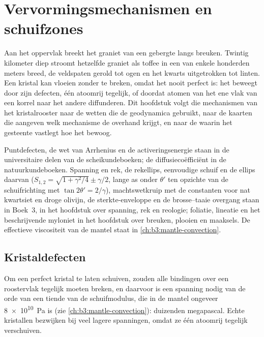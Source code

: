 \chapter{Vervormingsmechanismen en schuifzones}\label{ch:b3:deformation-mechanisms}

Aan het oppervlak breekt het graniet van een gebergte langs breuken. Twintig
kilometer diep stroomt hetzelfde graniet als toffee in een  van enkele
honderden meters breed, de veldspaten gerold tot ogen en het kwarts uitgetrokken
tot linten. Een kristal kan vloeien zonder te breken, omdat het nooit perfect is:
het beweegt door zijn defecten, één atoomrij tegelijk, of doordat atomen van
het ene vlak van een korrel naar het andere diffunderen. Dit hoofdstuk volgt die mechanismen van het
kristalrooster naar de wetten die de geodynamica gebruikt, naar de kaarten die aangeven welk
mechanisme de overhand krijgt, en naar de  waarin het gesteente vastlegt hoe het bewoog.

\begin{recall}
Puntdefecten, de wet van Arrhenius en de activeringsenergie staan in de
universitaire delen van de scheikundeboeken; de diffusiecoëfficiënt in de
natuurkundeboeken. Spanning en rek, de rekellips, eenvoudige schuif en de ellips daarvan
($S_{1,2} = \sqrt{1 + \gamma^2/4} \pm \gamma/2$, lange as onder $\theta'$ ten opzichte van de
schuifrichting met $\tan2\theta' = 2/\gamma$), machtswetkruip met de
constanten voor nat kwartsiet en droge olivijn, de sterkte-enveloppe en de
brosse--taaie overgang staan in Boek~3, in het hoofdstuk over
spanning, rek en reologie; foliatie, lineatie en het beschrijvende
myloniet in het hoofdstuk over breuken, plooien en maaksels. De effectieve viscositeit
van de mantel staat in \cref{ch:b3:mantle-convection}.
\end{recall}

\section{Kristaldefecten}

Om een perfect kristal te laten schuiven, zouden alle bindingen over een roostervlak tegelijk
moeten breken, en daarvoor is een spanning nodig van de orde van een tiende van de schuifmodulus,
die in de mantel ongeveer \qty{8e10}{Pa} is
(zie \cref{ch:b3:mantle-convection}): duizenden megapascal. Echte kristallen
bezwijken bij veel lagere spanningen, omdat ze één atoomrij tegelijk verschuiven.

